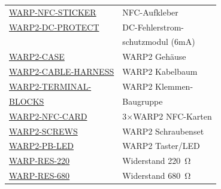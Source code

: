 \documentclass[a4paper,10pt]{article}
\begin{document}
\begin{multicols*}{2}
\begin{tabular}{ll}
		\cmidrule(lr{0.5em}){1-2}
		\href{https://www.tinkerforge.com/de/shop/warp/warp2-spare-parts/warp-nfc-sticker.html}{WARP-NFC-STICKER}                   & NFC-Aufkleber                        \\
		\cmidrule(lr{0.5em}){1-2}
		\href{https://www.tinkerforge.com/de/shop/warp/warp2-spare-parts/warp2-dc-protect.html}{WARP2-DC-PROTECT}                   & DC-Fehlerstrom-                      \\
		                                                                                                                            & schutzmodul (6mA)                    \\
		\cmidrule(lr{0.5em}){1-2}
		\href{https://www.tinkerforge.com/de/shop/warp/warp2-spare-parts.html}{WARP2-CASE}                                          & WARP2 Gehäuse                        \\
		\cmidrule(lr{0.5em}){1-2}
		\small{\href{https://www.tinkerforge.com/de/shop/warp/warp2-spare-parts/warp2-cable-harness.html}{WARP2-CABLE-HARNESS}}     & WARP2 Kabelbaum                      \\
		\cmidrule(lr{0.5em}){1-2}
		\href{https://www.tinkerforge.com/de/shop/warp/warp2-spare-parts/warp2-terminal-blocks.html}{WARP2-TERMINAL-}               & WARP2 Klemmen-                       \\
		\href{https://www.tinkerforge.com/de/shop/warp/warp2-spare-parts/warp2-terminal-blocks.html}{BLOCKS}                        & Baugruppe                            \\
		\cmidrule(lr{0.5em}){1-2}
		\href{https://www.tinkerforge.com/de/shop/warp/warp2-spare-parts/warp2-nfc-karte.html}{WARP2-NFC-CARD}                      & 3$\times$WARP2 NFC-Karten            \\
		\cmidrule(lr{0.5em}){1-2}
		\href{https://www.tinkerforge.com/de/shop/warp/warp2-spare-parts/warp2-screws.html}{WARP2-SCREWS}                           & WARP2 Schraubenset                   \\
		\cmidrule(lr{0.5em}){1-2}
		\href{https://www.tinkerforge.com/de/shop/warp/warp2-spare-parts/warp2-pb-led-set.html}{WARP2-PB-LED}                       & WARP2 Taster/LED                     \\
		\cmidrule(lr{0.5em}){1-2}
		\href{https://www.tinkerforge.com/de/shop/warp/warp2-spare-parts/warp-res-220.html}{WARP-RES-220}                           & Widerstand \SI{220}{\ohm}            \\
		\cmidrule(lr{0.5em}){1-2}
		\href{https://www.tinkerforge.com/de/shop/warp/warp2-spare-parts/warp-res-680.html}{WARP-RES-680}                           & Widerstand \SI{680}{\ohm}            \\

\end{tabular}
\end{multicols*}
\end{document}
